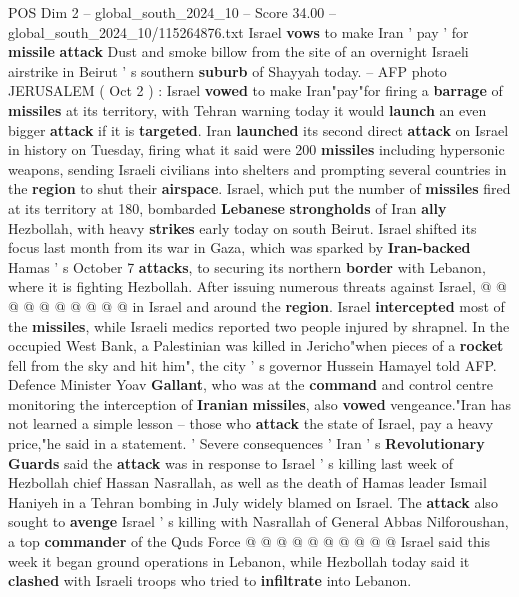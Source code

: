 \begin{textsample}{POS Dim 2 – global\_south\_2024\_10 – Score 34.00 – global\_south\_2024\_10/115264876.txt}  \label{ex:f2_pos_024}
Israel \textbf{vows} to make Iran ' pay ' for \textbf{missile} \textbf{attack} Dust and smoke billow from the site of an overnight Israeli airstrike in Beirut ' s southern \textbf{suburb} of Shayyah today. -- AFP photo JERUSALEM ( Oct 2 ) : Israel \textbf{vowed} to make Iran"pay"for firing a \textbf{barrage} of \textbf{missiles} at its territory, with Tehran warning today it would \textbf{launch} an even bigger \textbf{attack} if it is \textbf{targeted}.
Iran \textbf{launched} its second direct \textbf{attack} on Israel in history on Tuesday, firing what it said were 200 \textbf{missiles} including hypersonic weapons, sending Israeli civilians into shelters and prompting several countries in the \textbf{region} to shut their \textbf{airspace}.
Israel, which put the number of \textbf{missiles} fired at its territory at 180, bombarded \textbf{Lebanese} \textbf{strongholds} of Iran \textbf{ally} Hezbollah, with heavy \textbf{strikes} early today on south Beirut.
Israel shifted its focus last month from its war in Gaza, which was sparked by \textbf{Iran-backed} Hamas ' s October 7 \textbf{attacks}, to securing its northern \textbf{border} with Lebanon, where it is fighting Hezbollah.
After issuing numerous threats against Israel, @ @ @ @ @ @ @ @ @ @ in Israel and around the \textbf{region}.
Israel \textbf{intercepted} most of the \textbf{missiles}, while Israeli medics reported two people injured by shrapnel.
In the occupied West Bank, a Palestinian was killed in Jericho"when pieces of a \textbf{rocket} fell from the sky and hit him", the city ' s governor Hussein Hamayel told AFP.
Defence Minister Yoav \textbf{Gallant}, who was at the \textbf{command} and control centre monitoring the interception of \textbf{Iranian} \textbf{missiles}, also \textbf{vowed} vengeance."Iran has not learned a simple lesson -- those who \textbf{attack} the state of Israel, pay a heavy price,"he said in a statement. ' Severe consequences ' Iran ' s \textbf{Revolutionary} \textbf{Guards} said the \textbf{attack} was in response to Israel ' s killing last week of Hezbollah chief Hassan Nasrallah, as well as the death of Hamas leader Ismail Haniyeh in a Tehran bombing in July widely blamed on Israel.
The \textbf{attack} also sought to \textbf{avenge} Israel ' s killing with Nasrallah of General Abbas Nilforoushan, a top \textbf{commander} of the Quds Force @ @ @ @ @ @ @ @ @ @ Israel said this week it began ground operations in Lebanon, while Hezbollah today said it \textbf{clashed} with Israeli troops who tried to \textbf{infiltrate} into Lebanon.

\end{textsample}
